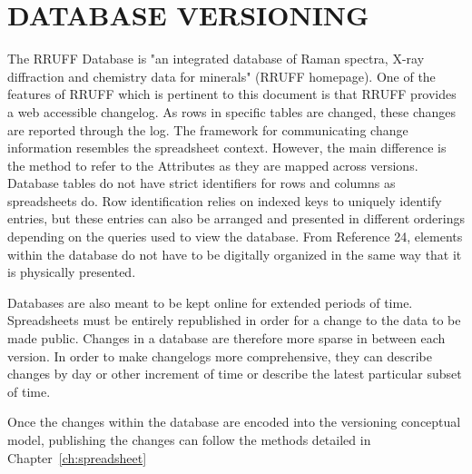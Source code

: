 
\chapter{DATABASE VERSIONING}

The RRUFF Database is "an integrated database of Raman spectra, X-ray diffraction and chemistry data for minerals" (RRUFF homepage).  One of the features of RRUFF which is pertinent to this document is that RRUFF provides a web accessible changelog.  As rows in specific tables are changed, these changes are reported through the log.  The framework for communicating change information resembles the spreadsheet context.  However, the main difference is the method to refer to the Attributes as they are mapped across versions.  Database tables do not have strict identifiers for rows and columns as spreadsheets do.  Row identification relies on indexed keys to uniquely identify entries, but these entries can also be arranged and presented in different orderings depending on the queries used to view the database.  From Reference 24, elements within the database do not have to be digitally organized in the same way that it is physically presented.

Databases are also meant to be kept online for extended periods of time.  Spreadsheets must be entirely republished in order for a change to the data to be made public.  Changes in a database are therefore more sparse in between each version.  In order to make changelogs more comprehensive, they can describe changes by day or other increment of time or describe the latest particular subset of time.

Once the changes within the database are encoded into the versioning conceptual model, publishing the changes can follow the methods detailed in Chapter~\ref{ch:spreadsheet}